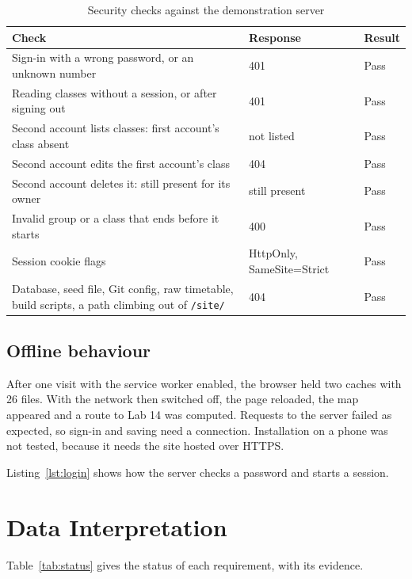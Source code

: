 \documentclass[12pt,a4paper]{report}
\newcommand{\tablespacing}{\singlespacing\small}
\begin{document}
\begin{table}[htbp]
\centering\tablespacing
\caption{Security checks against the demonstration server}\label{tab:security}
\begin{tabular}{>{\raggedright}p{8.2cm}>{\raggedright}p{3.6cm}>{\raggedright\arraybackslash}p{1.4cm}}
\toprule
Check & Response & Result \\
\midrule
Sign-in with a wrong password, or an unknown number & 401 & Pass \\
Reading classes without a session, or after signing out & 401 & Pass \\
Second account lists classes: first account's class absent & not listed & Pass \\
Second account edits the first account's class & 404 & Pass \\
Second account deletes it: still present for its owner & still present & Pass \\
Invalid group or a class that ends before it starts & 400 & Pass \\
Session cookie flags & HttpOnly, SameSite=Strict & Pass \\
Database, seed file, Git config, raw timetable, build scripts, a path climbing out of \texttt{/site/} & 404 & Pass \\
\bottomrule
\end{tabular}
\end{table}

\subsection{Offline behaviour}\label{sec:offline}
After one visit with the service worker enabled, the browser held two caches with 26 files. With the network then switched off, the page reloaded, the map appeared and a route to Lab 14 was computed. Requests to the server failed as expected, so sign-in and saving need a connection. Installation on a phone was not tested, because it needs the site hosted over HTTPS.

Listing~\ref{lst:login} shows how the server checks a password and starts a session.



\section{Data Interpretation}
Table~\ref{tab:status} gives the status of each requirement, with its evidence.
\end{document}
